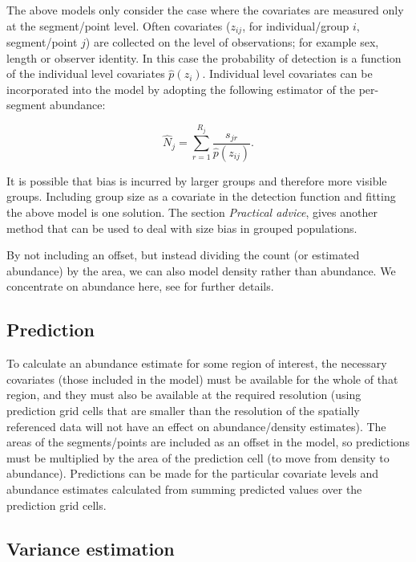 \documentclass[a4paper,12pt]{article}
\begin{document}
The above models only consider the case where the covariates are measured only at the segment/point level. Often covariates ($z_{ij}$, for individual/group $i$, segment/point $j$) are collected on the level of observations; for example sex, length or observer identity. In this case the probability of detection is a function of the individual level covariates $\hat{p}(z_i)$. Individual level covariates can be incorporated into the model by adopting the following estimator of the per-segment abundance:

\begin{equation*}
\hat{N}_j = \sum_{r=1}^{R_j} \frac{s_{jr}}{\hat{p}(z_{ij})}.
\end{equation*}

It is possible that bias is incurred by larger groups and therefore more visible groups. Including group size as a covariate in the detection function and fitting the above model is one solution. The section \textit{Practical advice}, gives another method that can be used to deal with size bias in grouped populations.

By not including an offset, but instead dividing the count (or estimated abundance) by the area, we can also model density rather than abundance. We concentrate on abundance here, see \cite{Hedley:2004et} for further details.

\subsection*{Prediction}

To calculate an abundance estimate for some region of interest, the necessary covariates (those included in the model) must be available for the whole of that region, and they must also be available at the required resolution (using prediction grid cells that are smaller than the resolution of the spatially referenced data will not have an effect on abundance/density estimates). The areas of the segments/points are included as an offset in the model, so predictions must be multiplied by the area of the prediction cell (to move from density to abundance). Predictions can be made for the particular covariate levels and abundance estimates calculated from summing predicted values over the prediction grid cells. 


\subsection*{Variance estimation}
\end{document}
